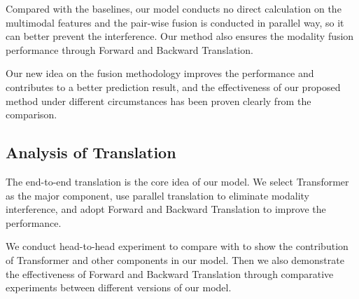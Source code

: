 \documentclass[sigconf]{acmart}
\begin{document}
	Compared with the baselines, our model conducts no direct calculation on the multimodal features and the pair-wise fusion is conducted in parallel way, so it can better prevent the interference. Our method also ensures the modality fusion performance through Forward and Backward Translation. 
	
	Our new idea on the fusion methodology improves the performance and contributes to a better prediction result, and the effectiveness of our proposed method under different circumstances has been proven clearly from the comparison.
	
	\subsection{Analysis of Translation}
	The end-to-end translation is the core idea of our model. We select Transformer as the major component, use parallel translation to eliminate modality interference, and adopt Forward and Backward Translation to improve the performance. 
	
	We conduct head-to-head experiment to compare with \citet{pham2018seq2seq2sentiment,pham2018found} to show the contribution of Transformer and other components in our model. Then we also demonstrate the effectiveness of Forward and Backward Translation through comparative experiments between different versions of our model.
	
\end{document}
